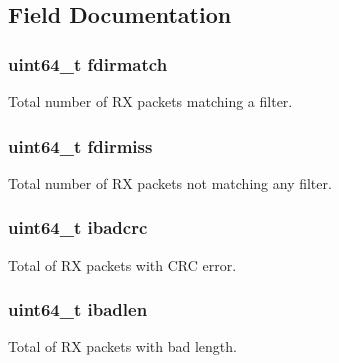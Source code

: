 \subsection{Field Documentation}
\hypertarget{structrte__eth__stats_abf92854ce27eb061859a43ba737ea58b}{}
\subsubsection[{fdirmatch}]{\setlength{\rightskip}{0pt plus 5cm}uint64\+\_\+t fdirmatch}\label{structrte__eth__stats_abf92854ce27eb061859a43ba737ea58b}
Total number of R\+X packets matching a filter. \hypertarget{structrte__eth__stats_ad74169688c2ec4ef03a6805a8f30b9ff}{}
\subsubsection[{fdirmiss}]{\setlength{\rightskip}{0pt plus 5cm}uint64\+\_\+t fdirmiss}\label{structrte__eth__stats_ad74169688c2ec4ef03a6805a8f30b9ff}
Total number of R\+X packets not matching any filter. \hypertarget{structrte__eth__stats_adc177fe8dee01846d6381f0a7a7682c6}{}
\subsubsection[{ibadcrc}]{\setlength{\rightskip}{0pt plus 5cm}uint64\+\_\+t ibadcrc}\label{structrte__eth__stats_adc177fe8dee01846d6381f0a7a7682c6}
Total of R\+X packets with C\+R\+C error. \hypertarget{structrte__eth__stats_a90fbfb9c0b092c4bfa5be8ee0b1808dc}{}
\subsubsection[{ibadlen}]{\setlength{\rightskip}{0pt plus 5cm}uint64\+\_\+t ibadlen}\label{structrte__eth__stats_a90fbfb9c0b092c4bfa5be8ee0b1808dc}
Total of R\+X packets with bad length. \hypertarget{structrte__eth__stats_a90c25a10d1e2ab583f03f6c5237563c0}{}
